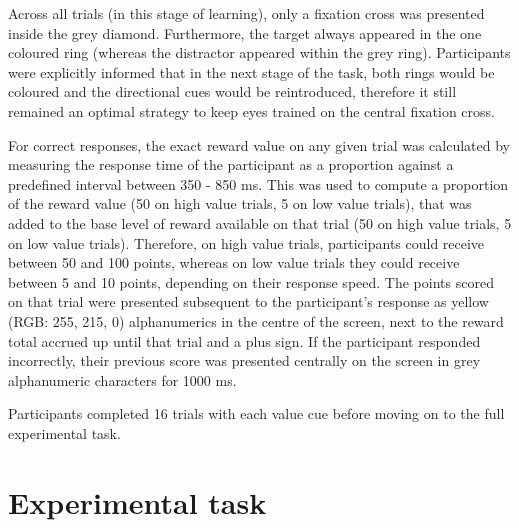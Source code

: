 \documentclass[11pt,halfline,a4paper,]{ouparticle}
\begin{document}
Across all trials (in this stage of learning), only a fixation cross was presented inside the grey diamond. Furthermore, the target always appeared in the one coloured ring (whereas the distractor appeared within the grey ring). Participants were explicitly informed that in the next stage of the task, both rings would be coloured and the directional cues would be reintroduced, therefore it still remained an optimal strategy to keep eyes trained on the central fixation cross.

For correct responses, the exact reward value on any given trial was calculated by measuring the response time of the participant as a proportion against a predefined interval between 350 - 850 ms. This was used to compute a proportion of the reward value (50 on high value trials, 5 on low value trials), that was added to the base level of reward available on that trial (50 on high value trials, 5 on low value trials). Therefore, on high value trials, participants could receive between 50 and 100 points, whereas on low value trials they could receive between 5 and 10 points, depending on their response speed. The points scored on that trial were presented subsequent to the participant's response as yellow (RGB: 255, 215, 0) alphanumerics in the centre of the screen, next to the reward total accrued up until that trial and a plus sign. If the participant responded incorrectly, their previous score was presented centrally on the screen in grey alphanumeric characters for 1000 ms.

Participants completed 16 trials with each value cue before moving on to the full experimental task.

\hypertarget{experimental-task}{%
\section{Experimental task}\label{experimental-task}}
\end{document}
